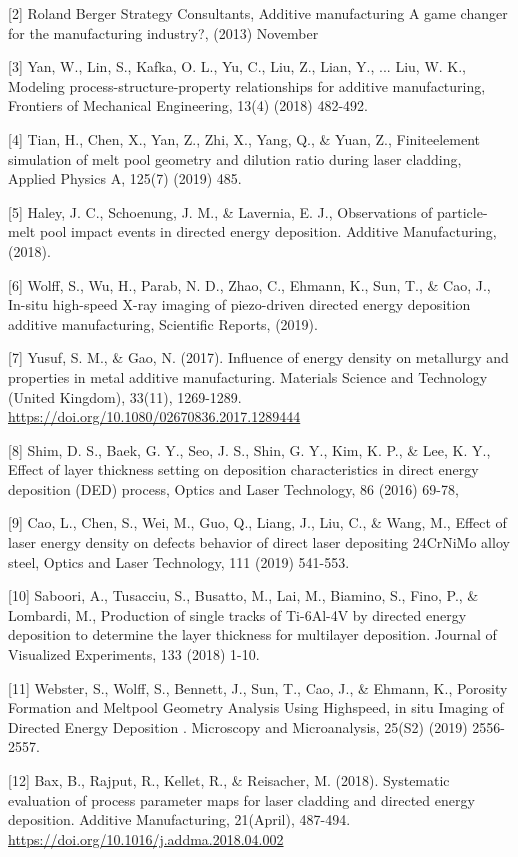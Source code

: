 \documentclass[10pt]{article}
\begin{document}
[2] Roland Berger Strategy Consultants, Additive manufacturing A game changer for the manufacturing industry?, (2013) November

[3] Yan, W., Lin, S., Kafka, O. L., Yu, C., Liu, Z., Lian, Y., ... Liu, W. K., Modeling process-structure-property relationships for additive manufacturing, Frontiers of Mechanical Engineering, 13(4) (2018) 482-492.

[4] Tian, H., Chen, X., Yan, Z., Zhi, X., Yang, Q., \& Yuan, Z., Finiteelement simulation of melt pool geometry and dilution ratio during laser cladding, Applied Physics A, 125(7) (2019) 485.

[5] Haley, J. C., Schoenung, J. M., \& Lavernia, E. J., Observations of particle-melt pool impact events in directed energy deposition. Additive Manufacturing, (2018).

[6] Wolff, S., Wu, H., Parab, N. D., Zhao, C., Ehmann, K., Sun, T., \& Cao, J., In-situ high-speed X-ray imaging of piezo-driven directed energy deposition additive manufacturing, Scientific Reports, (2019).

[7] Yusuf, S. M., \& Gao, N. (2017). Influence of energy density on metallurgy and properties in metal additive manufacturing. Materials Science and Technology (United Kingdom), 33(11), 1269-1289. \href{https://doi.org/10.1080/02670836.2017.1289444}{https://doi.org/10.1080/02670836.2017.1289444}

[8] Shim, D. S., Baek, G. Y., Seo, J. S., Shin, G. Y., Kim, K. P., \& Lee, K. Y., Effect of layer thickness setting on deposition characteristics in direct energy deposition (DED) process, Optics and Laser Technology, 86 (2016) 69-78,

[9] Cao, L., Chen, S., Wei, M., Guo, Q., Liang, J., Liu, C., \& Wang, M., Effect of laser energy density on defects behavior of direct laser depositing 24CrNiMo alloy steel, Optics and Laser Technology, 111 (2019) 541-553.

[10] Saboori, A., Tusacciu, S., Busatto, M., Lai, M., Biamino, S., Fino, P., \& Lombardi, M., Production of single tracks of Ti-6Al-4V by directed energy deposition to determine the layer thickness for multilayer deposition. Journal of Visualized Experiments, 133 (2018) 1-10.

[11] Webster, S., Wolff, S., Bennett, J., Sun, T., Cao, J., \& Ehmann, K., Porosity Formation and Meltpool Geometry Analysis Using Highspeed, in situ Imaging of Directed Energy Deposition . Microscopy and Microanalysis, 25(S2) (2019) 2556-2557.

[12] Bax, B., Rajput, R., Kellet, R., \& Reisacher, M. (2018). Systematic evaluation of process parameter maps for laser cladding and directed energy deposition. Additive Manufacturing, 21(April), 487-494. \href{https://doi.org/10.1016/j.addma.2018.04.002}{https://doi.org/10.1016/j.addma.2018.04.002}
\end{document}

